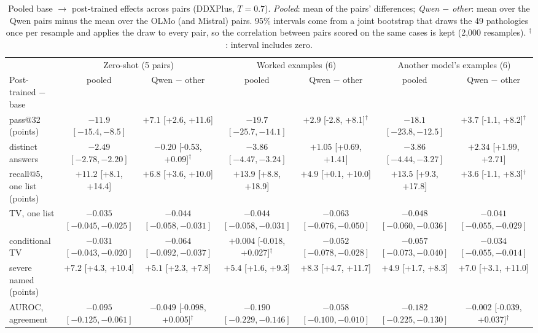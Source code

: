 \documentclass[wcp]{jmlr}
\begin{document}
\begin{table}[t]
\centering\small
\begin{adjustbox}{max width=\linewidth}
\begin{tabular}{lcccccc}
\toprule
 & \multicolumn{2}{c}{Zero-shot (5 pairs)} & \multicolumn{2}{c}{Worked examples (6)} & \multicolumn{2}{c}{Another model's examples (6)} \\
Post-trained $-$ base & pooled & Qwen $-$ other & pooled & Qwen $-$ other & pooled & Qwen $-$ other \\
\midrule
pass@32 (points) & $-11.9$ $[-15.4,-8.5]$ & $+7.1$ [+2.6, +11.6] & $-19.7$ $[-25.7,-14.1]$ & $+2.9$ [-2.8, +8.1]$^{\dagger}$ & $-18.1$ $[-23.8,-12.5]$ & $+3.7$ [-1.1, +8.2]$^{\dagger}$ \\
distinct answers & $-2.49$ $[-2.78,-2.20]$ & $-0.20$ [-0.53, +0.09]$^{\dagger}$ & $-3.86$ $[-4.47,-3.24]$ & $+1.05$ [+0.69, +1.41] & $-3.86$ $[-4.44,-3.27]$ & $+2.34$ [+1.99, +2.71] \\
recall@5, one list (points) & $+11.2$ [+8.1, +14.4] & $+6.8$ [+3.6, +10.0] & $+13.9$ [+8.8, +18.9] & $+4.9$ [+0.1, +10.0] & $+13.5$ [+9.3, +17.8] & $+3.6$ [-1.1, +8.3]$^{\dagger}$ \\
TV, one list & $-0.035$ $[-0.045,-0.025]$ & $-0.044$ $[-0.058,-0.031]$ & $-0.044$ $[-0.058,-0.031]$ & $-0.063$ $[-0.076,-0.050]$ & $-0.048$ $[-0.060,-0.036]$ & $-0.041$ $[-0.055,-0.029]$ \\
conditional TV & $-0.031$ $[-0.043,-0.020]$ & $-0.064$ $[-0.092,-0.037]$ & $+0.004$ [-0.018, +0.027]$^{\dagger}$ & $-0.052$ $[-0.078,-0.028]$ & $-0.057$ $[-0.073,-0.040]$ & $-0.034$ $[-0.055,-0.014]$ \\
severe named (points) & $+7.2$ [+4.3, +10.4] & $+5.1$ [+2.3, +7.8] & $+5.4$ [+1.6, +9.3] & $+8.3$ [+4.7, +11.7] & $+4.9$ [+1.7, +8.3] & $+7.0$ [+3.1, +11.0] \\
AUROC, agreement & $-0.095$ $[-0.125,-0.061]$ & $-0.049$ [-0.098, +0.005]$^{\dagger}$ & $-0.190$ $[-0.229,-0.146]$ & $-0.058$ $[-0.100,-0.010]$ & $-0.182$ $[-0.225,-0.130]$ & $-0.002$ [-0.039, +0.037]$^{\dagger}$ \\
\bottomrule
\end{tabular}
\end{adjustbox}
\caption{Pooled base $\rightarrow$ post-trained effects across pairs (DDXPlus, $T{=}0.7$). \emph{Pooled}: mean of the pairs' differences; \emph{Qwen $-$ other}: mean over the Qwen pairs minus the mean over the OLMo (and Mistral) pairs. 95\% intervals come from a joint bootstrap that draws the 49 pathologies once per resample and applies the draw to every pair, so the correlation between pairs scored on the same cases is kept (2,000 resamples). $^{\dagger}$: interval includes zero.}
\label{tab:meta}
\end{table}
\end{document}
